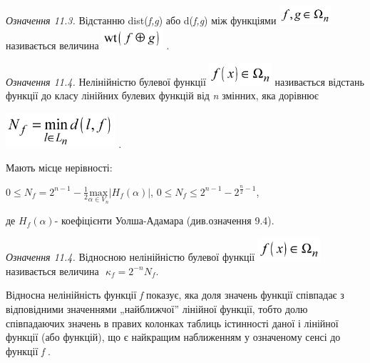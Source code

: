 \documentclass[a4paper]{article}
\newcounter{}
\begin{document}
 \textit{Означення 11.3.}\textit{ }Відстанню
dist(\textit{f}\textit{,}\textit{g}) або d(\textit{f}\textit{,}\textit{g})  між
функціями 
\includegraphics[width=0.7563in,height=0.2701in]{crypt-img/crypt-img262.png} 
називається  величина 
\includegraphics[width=0.8917in,height=0.3173in]{crypt-img/crypt-img263.png} .

 \textit{Означення 11.4.}\textit{  }Нелінійністю булевої функції 
\includegraphics[width=0.9098in,height=0.3354in]{crypt-img/crypt-img264.png} 
називається відстань функції до класу лінійних булевих функцій від
\textit{n}\textit{ }змінних, яка дорівнює

{\centering
 \includegraphics[width=1.6008in,height=0.5071in]{crypt-img/crypt-img265.png} .
\par}

Мають місце нерівності:  

 ${0\le N_{{f}}=2^{{n-1}}-\frac{1}{2}\underset{{\alpha \in
V_{{n}}}}{{\text{max}}}|H_{f}{(\alpha )}|}$,   ${0\le N_{{f}}\le
2^{{n-1}}-2^{{\frac{n}{2}-1}}}$,

де  ${H_{{f}}(\alpha )}${}-  коефіцієнти Уолша-Адамара (див.означення 9.4).

 \textit{Означення 11.4.}\textit{ }Відносною нелінійністю булевої функції 
\includegraphics[width=0.9098in,height=0.3354in]{crypt-img/crypt-img266.png} 
називається величина   $ $ ${\kappa _{{f}}=2^{{-n}}N_{{f}}}$.

Відносна нелінійність функції \textit{f}  показує, яка доля значень функції
співпадає з відповідними значеннями „найближчої” лінійної функції, тобто долю
співпадаючих  значень в правих колонках таблиць істинності даної і лінійної
функції (або функцій), що є найкращим наближенням у означеному сенсі до функції
\textit{f} .
\end{document}

